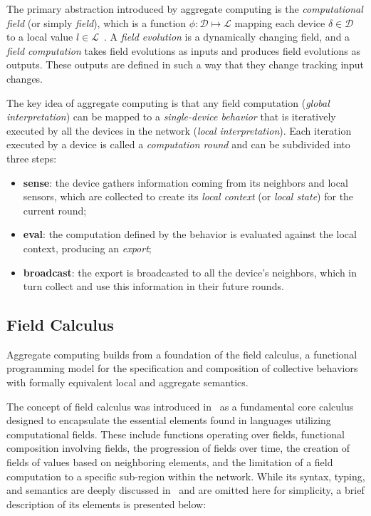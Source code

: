 The primary abstraction introduced by aggregate computing is the \textit{computational field} (or simply \textit{field}), which is a function $\phi: \mathcal{D} \mapsto \mathcal{L}$ mapping each device $\delta \in \mathcal{D}$ to a local value $l \in \mathcal{L}$~\cite{Viroli2018}.
%
A \textit{field evolution} is a dynamically changing field, and a \textit{field computation} takes field evolutions as inputs and produces field evolutions as outputs.
%
These outputs are defined in such a way that they change tracking input changes.

The key idea of aggregate computing is that any field computation (\textit{global interpretation}) can be mapped to a \textit{single-device behavior} that is iteratively executed by all the devices in the network (\textit{local interpretation}).
%
Each iteration executed by a device is called a \textit{computation round} and can be subdivided into three steps:
%
\begin{itemize}
    \item \textbf{sense}: the device gathers information coming from its neighbors and local sensors, which are collected to create its \textit{local context} (or \textit{local state}) for the current round;
    \item \textbf{eval}: the computation defined by the behavior is evaluated against the local context, producing an \textit{export};
    \item \textbf{broadcast}: the export is broadcasted to all the device's neighbors, which in turn collect and use this information in their future rounds.
\end{itemize}

\subsection{Field Calculus}
\label{subsection:field-calculus}

Aggregate computing builds from a foundation of the field calculus, a functional programming model for the specification and composition of collective behaviors with formally equivalent local and aggregate semantics.

The concept of field calculus was introduced in~\cite{Viroli2013} as a fundamental core calculus designed to encapsulate the essential elements found in languages utilizing computational fields. These include functions operating over fields, functional composition involving fields, the progression of fields over time, the creation of fields of values based on neighboring elements, and the limitation of a field computation to a specific sub-region within the network. While its syntax, typing, and semantics are deeply discussed in~\cite{Viroli2019} and are omitted here for simplicity, a brief description of its elements is presented below:


